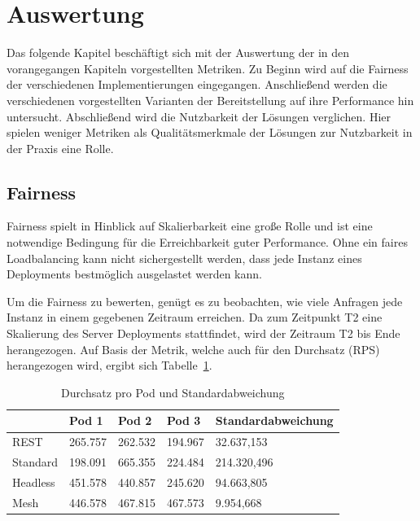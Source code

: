 \newpage


\section{Auswertung}\label{sec:auswertung}

Das folgende Kapitel beschäftigt sich mit der Auswertung der in den vorangegangen Kapiteln vorgestellten Metriken.
Zu Beginn wird auf die Fairness der verschiedenen Implementierungen eingegangen.
Anschließend werden die verschiedenen vorgestellten Varianten der Bereitstellung auf ihre Performance hin untersucht.
Abschließend wird die Nutzbarkeit der Lösungen verglichen.
Hier spielen weniger Metriken als Qualitätsmerkmale der Lösungen zur Nutzbarkeit in der Praxis eine Rolle.

\subsection{Fairness}\label{subsec:fairness}

Fairness spielt in Hinblick auf Skalierbarkeit eine große Rolle und ist eine notwendige Bedingung für die Erreichbarkeit guter Performance.
Ohne ein faires Loadbalancing kann nicht sichergestellt werden, dass jede Instanz eines Deployments bestmöglich ausgelastet werden kann.

Um die Fairness zu bewerten, genügt es zu beobachten, wie viele Anfragen jede Instanz in einem gegebenen Zeitraum erreichen.
Da zum Zeitpunkt T2 eine Skalierung des Server Deployments stattfindet, wird der Zeitraum T2 bis Ende herangezogen.
Auf Basis der Metrik, welche auch für den Durchsatz (RPS) herangezogen wird, ergibt sich Tabelle~\ref{tab:requests}.

\begin{table}[H]
    \centering
    \begin{tabular}{|l|l|l|l|l|}
        \hline
        & Pod 1  & Pod 2  & Pod 3  & Standardabweichung \\ \hline
        REST     & 265.757 & 262.532 & 194.967 & 32.637,153          \\ \hline
        Standard & 198.091 & 665.355 & 224.484 & 214.320,496         \\ \hline
        Headless & 451.578 & 440.857 & 245.620 & 94.663,805          \\ \hline
        Mesh     & 446.578 & 467.815 & 467.573 & 9.954,668           \\ \hline
    \end{tabular}
    \caption{Durchsatz pro Pod und Standardabweichung}
    \label{tab:requests}
\end{table}

